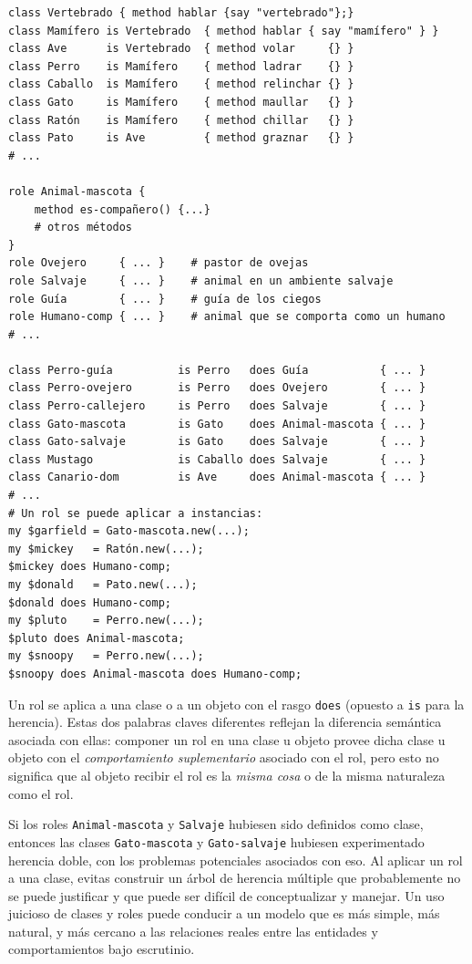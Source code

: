 \begin{lstlisting}
class Vertebrado { method hablar {say "vertebrado"};}
class Mamífero is Vertebrado  { method hablar { say "mamífero" } }
class Ave      is Vertebrado  { method volar     {} }
class Perro    is Mamífero    { method ladrar    {} }
class Caballo  is Mamífero    { method relinchar {} }
class Gato     is Mamífero    { method maullar   {} }
class Ratón    is Mamífero    { method chillar   {} }
class Pato     is Ave         { method graznar   {} }
# ...

role Animal-mascota { 
    method es-compañero() {...} 
    # otros métodos
}
role Ovejero     { ... }    # pastor de ovejas
role Salvaje     { ... }    # animal en un ambiente salvaje
role Guía        { ... }    # guía de los ciegos
role Humano-comp { ... }    # animal que se comporta como un humano
# ...

class Perro-guía          is Perro   does Guía           { ... }
class Perro-ovejero       is Perro   does Ovejero        { ... }
class Perro-callejero     is Perro   does Salvaje        { ... }
class Gato-mascota        is Gato    does Animal-mascota { ... }
class Gato-salvaje        is Gato    does Salvaje        { ... }
class Mustago             is Caballo does Salvaje        { ... }
class Canario-dom         is Ave 	 does Animal-mascota { ... }
# ...
# Un rol se puede aplicar a instancias:
my $garfield = Gato-mascota.new(...);
my $mickey   = Ratón.new(...);
$mickey does Humano-comp;
my $donald   = Pato.new(...);
$donald does Humano-comp; 
my $pluto    = Perro.new(...);
$pluto does Animal-mascota;
my $snoopy   = Perro.new(...);
$snoopy does Animal-mascota does Humano-comp;
\end{lstlisting}
 
Un rol se aplica a una clase o a un objeto con el rasgo
{\tt does} (opuesto a {\tt is} para la herencia). Estas dos
palabras claves diferentes reflejan la diferencia semántica
asociada con ellas: componer un rol en una clase u objeto
provee dicha clase u objeto con el \emph{comportamiento suplementario}
asociado con el rol, pero esto no significa que al objeto
recibir el rol es la \emph{misma cosa} o de la misma naturaleza como 
el rol.

Si los roles {\tt Animal-mascota} y {\tt Salvaje} hubiesen sido 
definidos como clase, entonces las clases {\tt Gato-mascota} y
{\tt Gato-salvaje} hubiesen experimentado herencia doble,
con los problemas potenciales asociados con eso. Al aplicar
un rol a una clase, evitas construir un árbol de herencia múltiple
que probablemente no se puede justificar y que puede ser difícil de
conceptualizar y manejar. Un uso juicioso de clases y roles puede 
conducir a un modelo que es más simple, más natural, y más cercano
a las relaciones reales entre las entidades y comportamientos 
bajo escrutinio.

